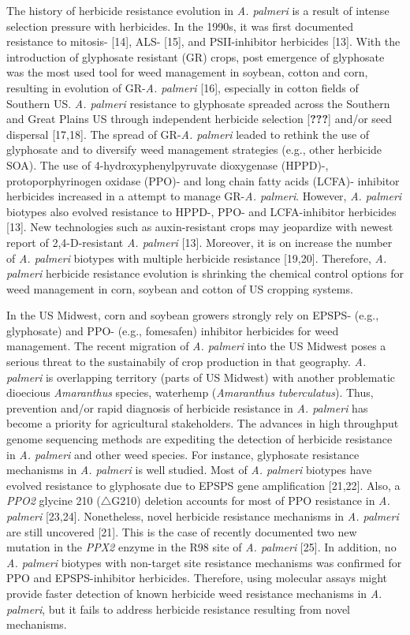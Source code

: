 \documentclass[10pt,letterpaper]{article}
\begin{document}
The history of herbicide resistance evolution in \emph{A. palmeri} is a
result of intense selection pressure with herbicides. In the 1990s, it
was first documented resistance to mitosis- {[}14{]}, ALS- {[}15{]}, and
PSII-inhibitor herbicides {[}13{]}. With the introduction of glyphosate
resistant (GR) crops, post emergence of glyphosate was the most used
tool for weed management in soybean, cotton and corn, resulting in
evolution of GR-\emph{A. palmeri} {[}16{]}, especially in cotton fields
of Southern US. \emph{A. palmeri} resistance to glyphosate spreaded
across the Southern and Great Plains US through independent herbicide
selection {[}{\textbf{???}}{]} and/or seed dispersal {[}17,18{]}. The
spread of GR-\emph{A. palmeri} leaded to rethink the use of glyphosate
and to diversify weed management strategies (e.g., other herbicide SOA).
The use of 4-hydroxyphenylpyruvate dioxygenase (HPPD)-,
protoporphyrinogen oxidase (PPO)- and long chain fatty acids (LCFA)-
inhibitor herbicides increased in a attempt to manage GR-\emph{A.
palmeri}. However, \emph{A. palmeri} biotypes also evolved resistance to
HPPD-, PPO- and LCFA-inhibitor herbicides {[}13{]}. New technologies
such as auxin-resistant crops may jeopardize with newest report of
2,4-D-resistant \emph{A. palmeri} {[}13{]}. Moreover, it is on increase
the number of \emph{A. palmeri} biotypes with multiple herbicide
resistance {[}19,20{]}. Therefore, \emph{A. palmeri} herbicide
resistance evolution is shrinking the chemical control options for weed
management in corn, soybean and cotton of US cropping systems.

In the US Midwest, corn and soybean growers strongly rely on EPSPS-
(e.g., glyphosate) and PPO- (e.g., fomesafen) inhibitor herbicides for
weed management. The recent migration of \emph{A. palmeri} into the US
Midwest poses a serious threat to the sustainabily of crop production in
that geography. \emph{A. palmeri} is overlapping territory (parts of US
Midwest) with another problematic dioecious \emph{Amaranthus} species,
waterhemp (\emph{Amaranthus tuberculatus}). Thus, prevention and/or
rapid diagnosis of herbicide resistance in \emph{A. palmeri} has become
a priority for agricultural stakeholders. The advances in high
throughput genome sequencing methods are expediting the detection of
herbicide resistance in \emph{A. palmeri} and other weed species. For
instance, glyphosate resistance mechanisms in \emph{A. palmeri} is well
studied. Most of \emph{A. palmeri} biotypes have evolved resistance to
glyphosate due to EPSPS gene amplification {[}21,22{]}. Also, a
\emph{PPO2} glycine 210 (\(\triangle\)G210) deletion accounts for most
of PPO resistance in \emph{A. palmeri} {[}23,24{]}. Nonetheless, novel
herbicide resistance mechanisms in \emph{A. palmeri} are still uncovered
{[}21{]}. This is the case of recently documented two new mutation in
the \emph{PPX2} enzyme in the R98 site of \emph{A. palmeri} {[}25{]}. In
addition, no \emph{A. palmeri} biotypes with non-target site resistance
mechanisms was confirmed for PPO and EPSPS-inhibitor herbicides.
Therefore, using molecular assays might provide faster detection of
known herbicide weed resistance mechanisms in \emph{A. palmeri}, but it
fails to address herbicide resistance resulting from novel mechanisms.
\end{document}
